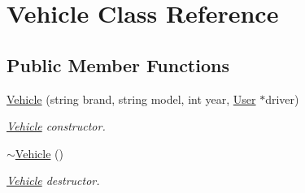 \hypertarget{class_vehicle}{}\section{Vehicle Class Reference}
\label{class_vehicle}
\subsection*{Public Member Functions}
\begin{DoxyCompactItemize}
\item 
\hyperlink{group___vehicle_ga9e9c39065cec28140e97259a324f6d5a}{Vehicle} (string brand, string model, int year, \hyperlink{class_user}{User} $\ast$driver)
\begin{DoxyCompactList}\small\item\em \hyperlink{class_vehicle}{Vehicle} constructor. \end{DoxyCompactList}\item 
\hyperlink{group___vehicle_ga61ab140c755b8e0e824d54117cf4546f}{$\sim$\+Vehicle} ()
\begin{DoxyCompactList}\small\item\em \hyperlink{class_vehicle}{Vehicle} destructor. \end{DoxyCompactList}\end{DoxyCompactItemize}
